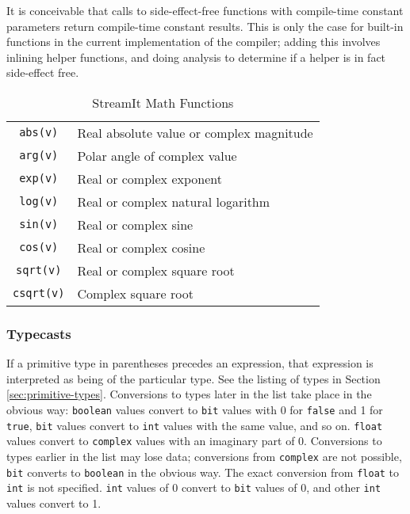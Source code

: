 \documentclass[11pt]{article}
\begin{document}
\begin{note}
  It is conceivable that calls to side-effect-free functions with
  compile-time constant parameters return compile-time constant
  results.  This is only the case for built-in functions in the
  current implementation of the compiler; adding this involves
  inlining helper functions, and doing analysis to determine if a
  helper is in fact side-effect free.
\end{note}

\begin{table}[htbp]
  \begin{center}
    \begin{tabular}{cl}
      \toprule
      \texttt{abs(v)} & Real absolute value or complex magnitude \\
      \texttt{arg(v)} & Polar angle of complex value \\
      \texttt{exp(v)} & Real or complex exponent \\
      \texttt{log(v)} & Real or complex natural logarithm \\
      \texttt{sin(v)} & Real or complex sine \\
      \texttt{cos(v)} & Real or complex cosine \\
      \texttt{sqrt(v)} & Real or complex square root \\
      \texttt{csqrt(v)} & Complex square root \\
      \bottomrule
    \end{tabular}
    \caption{StreamIt Math Functions}
    \label{tab:math-functions}
  \end{center}
\end{table}

\subsubsection{Typecasts}

If a primitive type in parentheses precedes an expression, that
expression is interpreted as being of the particular type.  See the
listing of types in Section \ref{sec:primitive-types}.  Conversions to
types later in the list take place in the obvious way:
\lstinline|boolean| values convert to \lstinline|bit| values with 0
for \lstinline|false| and 1 for \lstinline|true|, \lstinline|bit|
values convert to \lstinline|int| values with the same value, and so
on.  \lstinline|float| values convert to \lstinline|complex| values
with an imaginary part of 0.  Conversions to types earlier in the list
may lose data; conversions from \lstinline|complex| are not possible,
\lstinline|bit| converts to \lstinline|boolean| in the obvious way.
The exact conversion from \lstinline|float| to \lstinline|int| is not
specified.  \lstinline|int| values of 0 convert to \lstinline|bit|
values of 0, and other \lstinline|int| values convert to 1.
\end{document}
